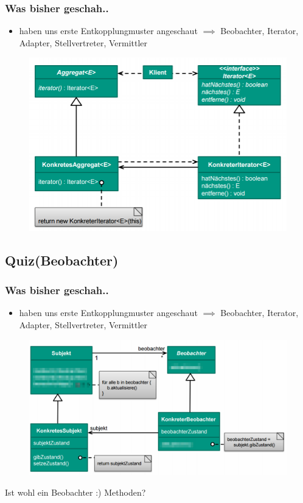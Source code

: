 \documentclass[18pt]{beamer}
\begin{document}
	\begin{frame}
		\frametitle{Was bisher geschah..}
		\begin{itemize}
			\item haben uns erste Entkopplungmuster angeschaut
			\linebreak $\implies$ Beobachter, Iterator, Adapter, Stellvertreter, Vermittler
		\end{itemize}
		\begin{figure}
			\includegraphics[scale=0.35]{./pics/tut3/iter.png}
		\end{figure}
	\end{frame}
	
	\subsection{Quiz(Beobachter)}
	
	\begin{frame}
		\frametitle{Was bisher geschah..}
		\begin{itemize}
			\item haben uns erste Entkopplungmuster angeschaut
			\linebreak $\implies$ Beobachter, Iterator, Adapter, Stellvertreter, Vermittler
		\end{itemize}
		\begin{figure}
			\includegraphics[scale=0.25]{./pics/tut4/obs-mod.png}
		\end{figure}
		\pause Ist wohl ein Beobachter :) \pause Methoden?
	\end{frame}
	
\end{document}
